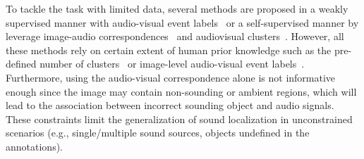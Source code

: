 To tackle the task with limited data, several methods are proposed in a weakly supervised manner with audio-visual event labels~\cite{av_eccv20_mms_loc} or a self-supervised manner by leverage image-audio correspondences~\cite{av_cvpr18_lls,av_tpami20_lls} and audiovisual clusters~\cite{av_arxiv_curricumlum_av_clutser,av_cvpr19_deep_cluster}.
%
%
%
However, all these methods rely on certain extent of human prior knowledge such as the pre-defined number of clusters~\cite{av_cvpr19_deep_cluster,av_arxiv_curricumlum_av_clutser} or image-level audio-visual event labels~\cite{av_eccv20_mms_loc}.
%
Furthermore, using the audio-visual correspondence alone is not informative enough since the image may contain non-sounding or ambient regions, which will lead to the association between incorrect sounding object and audio signals.
%
These constraints limit the generalization of sound localization in unconstrained scenarios (e.g., single/multiple sound sources, objects undefined in the annotations).
%

